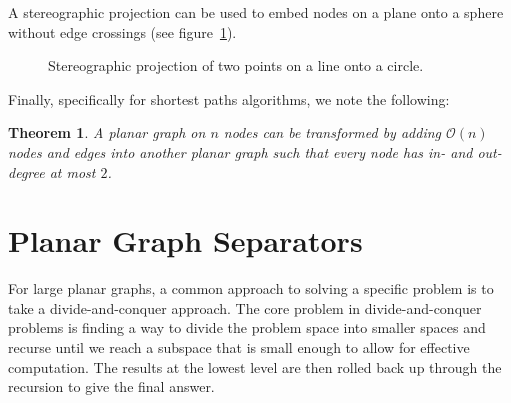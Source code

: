 \documentclass[11pt]{article}
\newtheorem{theorem}{Theorem}[section]
\begin{document}
A stereographic projection can be used to embed nodes on a plane onto a sphere without edge crossings (see figure~\ref{fig:stereo}).

\begin{figure}[!htb]
  \centering
  \caption{Stereographic projection of two points on a line onto a circle.}
  \label{fig:stereo}
\end{figure}

Finally, specifically for shortest paths algorithms, we note the following:\\

\begin{theorem}
  A planar graph on $n$ nodes can be transformed by adding $\mathcal{O}(n)$ nodes and edges into another planar graph such that every node has in- and out-degree at most $2$.
\end{theorem}

\section{Planar Graph Separators}
\label{sec:graph-sep}



    For large planar graphs, a common approach to solving a specific problem is to take a divide-and-conquer approach. The core problem in divide-and-conquer problems is finding a way to divide the problem space into smaller spaces and recurse until we reach a subspace that is small enough to allow for effective computation. The results at the lowest level are then rolled back up through the recursion to give the final answer.
\end{document}
